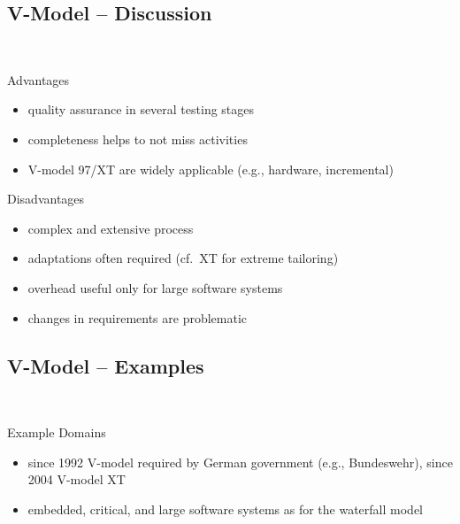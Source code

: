 \subsection{V-Model -- Discussion}
\begin{frame}{\insertsubsection\ \mytitlesource{\ludewiglichter}}
	\begin{fancycolumns}
		\begin{note}{Advantages}
			\begin{itemize}
				\item quality assurance in several testing stages
				\item completeness helps to not miss activities
				\item V-model 97/XT are widely applicable (e.g., hardware, incremental)
			\end{itemize}
		\end{note}
		\nextcolumn
		\begin{note}{Disadvantages}
				\begin{itemize}
					\item complex and extensive process
					\item adaptations often required (cf.\ XT for extreme tailoring)
					\item overhead useful only for large software systems
					\item changes in requirements are problematic
				\end{itemize}
		\end{note}
	\end{fancycolumns}
\end{frame}

\subsection{V-Model -- Examples}
\begin{frame}{\insertsubsection\ \mytitlesource{\ludewiglichter}}
	\begin{fancycolumns}[animation=none]
		\begin{example}{Example Domains}
				\begin{itemize}
					\item since 1992 V-model required by German government (e.g., Bundeswehr), since 2004 V-model XT
					\item embedded, critical, and large software systems as for the waterfall model
				\end{itemize}
		\end{example}
		\nextcolumn
	\end{fancycolumns}
\end{frame}

